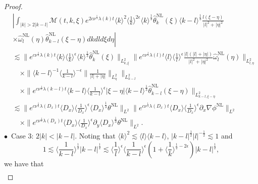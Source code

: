 \documentclass[reqno, 12pt]{amsart} %
\theoremstyle{plain} %
\theoremstyle{definition}
\theoremstyle{remark}
\numberwithin{equation}{section} %
\newcommand{\no}{\nonumber}
\newcommand{\lt}{\left}
\newcommand{\rt}{\right}
\newcommand{\px}{\partial_x}
\newcommand{\py}{\partial_y}
\begin{document}
\begin{proof}
\begin{align}
			&\no \left| \int_{|k| > 2|k-l| } \mathcal{M}(t, k, \xi) e^{2 c \nu^{\frac{1}{3}} \lambda(k) t}\langle k\rangle^2\langle\frac{1}{k}\rangle^{2 \epsilon} \langle k \rangle^\frac13\hat{\theta}_k^{\mathrm{NL}}(\xi) \langle k-l \rangle^\frac13  \frac{l(\xi - \eta)}{|l|^2+|\eta|^2}\right. \\
			&\lt. \no \times \hat{\omega}_l^{\mathrm{NL}}(\eta) \hat{\theta}_{k-l}^{\mathrm{NL}}(\xi-\eta) d k d l d \xi d \eta \rt| \\
			&\no \lesssim\|e^{c \nu^{\frac{1}{3}} \lambda(k) t}  \langle k \rangle \langle \frac1k \rangle^\epsilon \langle k \rangle^\frac13  \hat{\theta}_k^{\mathrm{NL}}(\xi)\|_{L_{k, \xi}^2}\|e^{c \nu^{\frac{1}{3}} \lambda(l) t}\langle l\rangle\langle\frac{1}{l}\rangle^\epsilon   \frac{|l|(|l|+|\eta|)}{|l|^2  + |\eta|^2} \hat{\omega}_l^{\mathrm{NL}}(\eta)\|_{L_{l, \eta}^2}         \\
			&\no \quad \times \|\langle k- l\rangle^{-1}\langle\frac{1}{k-l}\rangle^{-\epsilon}   \| \frac{1}{|l| + | \eta|} \|_{L_{\eta}^2}\|_{L_{k-l}^2}  \\
			&\no \quad \times  \|e^{c \nu^{\frac{1}{3}} \lambda(k-l) t}\langle k-l \rangle  \langle \frac{1}{k-l} \rangle^\epsilon   |\xi - \eta|\langle k-l \rangle ^\frac13  \hat{\theta}_{k-l}^{\mathrm{NL}}(\xi-\eta)\|_{L_{k-l, \xi-\eta}^2} \\
			&\no \lesssim\|e^{c \nu^{\frac{1}{3}} \lambda\left(D_x\right) t}\langle D_x\rangle    \langle \frac{1}{D_x}\rangle^\epsilon  \langle D_x \rangle^{\frac{1}{3}} \theta^{\mathrm{NL}}\|_{L^2} \|e^{c \nu^{\frac{1}{3}} \lambda\left(D_x\right) t}\langle D_x\rangle\langle\frac{1}{D_x}\rangle^\epsilon \px \nabla \phi^{\mathrm{NL}}\|_{L^2} \\
			& \quad \times\|e^{c \nu^{\frac{1}{3}} \lambda\left(D_x\right) t}\langle D_x\rangle\langle\frac{1}{D_x}\rangle^\epsilon \py \langle D_x \rangle^{\frac{1}{3}} \theta^{\mathrm{NL}}\|_{L^2} .
		\end{align}
		$\bullet$~Case 3:   $2|k| < |k-l| $. Noting that $ \langle k \rangle^2 \lesssim \langle l \rangle \langle k-l \rangle$, $|k-l|^\frac12 |l|^{-\frac12} \lesssim 1$ and 
		\begin{equation} \label{eq:trick10}
			1 \lesssim \langle \frac{1}{k-l} \rangle^\frac12 |k-l|^{\frac12} \lesssim \langle\frac{1}{l}\rangle^\epsilon\langle\frac{1}{k-l}\rangle^\epsilon\left(1+\langle\frac{1}{k}\rangle^{\frac{1}{2}-2 \epsilon}\right)|k-l|^{\frac12},
		\end{equation} 
		we have that
		\begin{align} \label{eq:temp38}

\end{align}
\end{proof}
\end{document}
